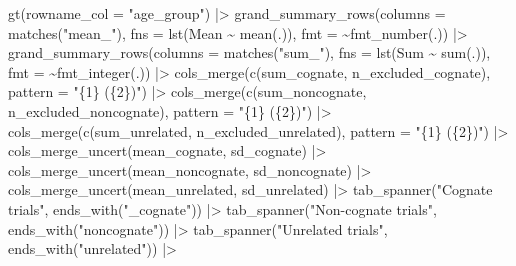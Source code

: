 \documentclass[
  letterpaper,
  DIV=11,
  numbers=noendperiod]{scrartcl}
\newenvironment{Shaded}{\begin{snugshade}}{\end{snugshade}}
\newcommand{\AttributeTok}[1]{\textcolor[rgb]{0.40,0.45,0.13}{#1}}
\newcommand{\FunctionTok}[1]{\textcolor[rgb]{0.28,0.35,0.67}{#1}}
\newcommand{\NormalTok}[1]{\textcolor[rgb]{0.00,0.23,0.31}{#1}}
\newcommand{\SpecialCharTok}[1]{\textcolor[rgb]{0.37,0.37,0.37}{#1}}
\newcommand{\StringTok}[1]{\textcolor[rgb]{0.13,0.47,0.30}{#1}}
\begin{document}
\begin{Shaded}
\begin{Highlighting}[]
    \FunctionTok{gt}\NormalTok{(}\AttributeTok{rowname\_col =} \StringTok{"age\_group"}\NormalTok{) }\SpecialCharTok{|\textgreater{}} 
    \FunctionTok{grand\_summary\_rows}\NormalTok{(}\AttributeTok{columns =} \FunctionTok{matches}\NormalTok{(}\StringTok{"mean\_"}\NormalTok{),}
                       \AttributeTok{fns =} \FunctionTok{lst}\NormalTok{(Mean }\SpecialCharTok{\textasciitilde{}} \FunctionTok{mean}\NormalTok{(.)),}
                       \AttributeTok{fmt =} \SpecialCharTok{\textasciitilde{}}\FunctionTok{fmt\_number}\NormalTok{(.)) }\SpecialCharTok{|\textgreater{}}
    \FunctionTok{grand\_summary\_rows}\NormalTok{(}\AttributeTok{columns =} \FunctionTok{matches}\NormalTok{(}\StringTok{"sum\_"}\NormalTok{),}
                       \AttributeTok{fns =} \FunctionTok{lst}\NormalTok{(Sum }\SpecialCharTok{\textasciitilde{}} \FunctionTok{sum}\NormalTok{(.)),}
                       \AttributeTok{fmt =} \SpecialCharTok{\textasciitilde{}}\FunctionTok{fmt\_integer}\NormalTok{(.)) }\SpecialCharTok{|\textgreater{}}
    \FunctionTok{cols\_merge}\NormalTok{(}\FunctionTok{c}\NormalTok{(sum\_cognate, n\_excluded\_cognate), }
               \AttributeTok{pattern =} \StringTok{"\{1\} (\{2\})"}\NormalTok{) }\SpecialCharTok{|\textgreater{}} 
    \FunctionTok{cols\_merge}\NormalTok{(}\FunctionTok{c}\NormalTok{(sum\_noncognate, n\_excluded\_noncognate), }
               \AttributeTok{pattern =} \StringTok{"\{1\} (\{2\})"}\NormalTok{) }\SpecialCharTok{|\textgreater{}} 
    \FunctionTok{cols\_merge}\NormalTok{(}\FunctionTok{c}\NormalTok{(sum\_unrelated, n\_excluded\_unrelated),}
               \AttributeTok{pattern =} \StringTok{"\{1\} (\{2\})"}\NormalTok{) }\SpecialCharTok{|\textgreater{}} 
    \FunctionTok{cols\_merge\_uncert}\NormalTok{(mean\_cognate, sd\_cognate) }\SpecialCharTok{|\textgreater{}} 
    \FunctionTok{cols\_merge\_uncert}\NormalTok{(mean\_noncognate, sd\_noncognate) }\SpecialCharTok{|\textgreater{}} 
    \FunctionTok{cols\_merge\_uncert}\NormalTok{(mean\_unrelated, sd\_unrelated) }\SpecialCharTok{|\textgreater{}} 
    \FunctionTok{tab\_spanner}\NormalTok{(}\StringTok{"Cognate trials"}\NormalTok{, }\FunctionTok{ends\_with}\NormalTok{(}\StringTok{"\_cognate"}\NormalTok{)) }\SpecialCharTok{|\textgreater{}}
    \FunctionTok{tab\_spanner}\NormalTok{(}\StringTok{"Non{-}cognate trials"}\NormalTok{, }\FunctionTok{ends\_with}\NormalTok{(}\StringTok{"noncognate"}\NormalTok{)) }\SpecialCharTok{|\textgreater{}} 
    \FunctionTok{tab\_spanner}\NormalTok{(}\StringTok{"Unrelated trials"}\NormalTok{, }\FunctionTok{ends\_with}\NormalTok{(}\StringTok{"unrelated"}\NormalTok{)) }\SpecialCharTok{|\textgreater{}} 

\end{Highlighting}
\end{Shaded}
\end{document}
